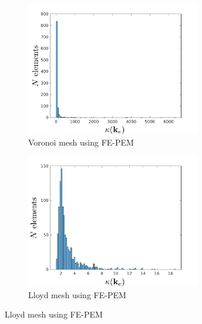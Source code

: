





\begin{figure}[!h]
    \centering
    \begin{subfigure}[b]{0.49\linewidth}
            \centering
            \includegraphics[width=3.0in]{figures/patch_condition_number_FEPEM.pdf}
    			\caption{Voronoi mesh using FE-PEM \label{fig:patch_condition_number_FEPEM}}
    \end{subfigure}
	\begin{subfigure}[b]{0.49\linewidth}
            \centering
            \includegraphics[width=3.0in]{figures/lloyd_condition_number_FEPEM.pdf}
    			\caption{Lloyd mesh using FE-PEM \label{fig:lloyd_condition_number_FEPEM}}

\end{subfigure}
\end{figure}

